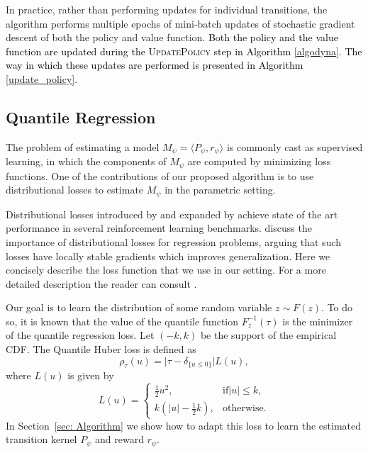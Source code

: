 \documentclass{article}
\begin{document}
    In practice, rather than performing updates for individual transitions, the algorithm performs multiple epochs of mini-batch updates of stochastic gradient descent of both the policy and value function. \textcolor{black}{Both the policy and the value function are updated during the \textsc{UpdatePolicy} step in Algorithm \ref{algodyna}. The way in which these updates are performed is presented in Algorithm \ref{update_policy}.}

\subsection{Quantile Regression}


	The problem of estimating a model $M_\psi = \langle P_\psi, r_\psi \rangle$ is commonly cast as supervised learning, in which the components of $M_\psi$ are computed by minimizing loss functions. One of the contributions of our proposed algorithm is to use distributional losses to estimate $M_\psi$ in the parametric setting.

	Distributional losses introduced by \citet{bellemare2017distributional} and expanded by \citet{dabney2018distributional} achieve state of the art performance in several reinforcement learning benchmarks. \citet{imani2018improving} discuss the importance of distributional losses for regression problems, arguing that such losses have locally stable gradients which improves generalization. Here we concisely describe the loss function that we use in our setting. For a more detailed description the reader can consult \citet{dabney2018distributional}. 

	Our goal is to learn the distribution of some random variable $z \sim F(z)$. To do so, it is known that the value of the quantile function $F^{-1}_z(\tau)$ is the minimizer of the quantile regression loss. Let $(-k, k)$ be the support of the empirical CDF. The Quantile Huber loss is defined as
		\begin{equation}
			\rho_{\tau}(u) = \lvert \tau - \delta_{\{u\leq0\}}\rvert L(u),
		\end{equation}
	where $L(u)$ is given by
		\begin{equation}
			L(u) = 
			\begin{cases}
				\frac{1}{2} u^2,& \text{if} \lvert u \rvert \leq k, \\
				k(\lvert u\rvert - \frac{1}{2}k),& \text{otherwise}.
			\end{cases}
		\end{equation}
In Section~\ref{sec: Algorithm} we show how to adapt this loss to learn the estimated transition kernel $P_\psi$ and reward $r_\psi$.
\end{document}
